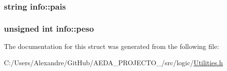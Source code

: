 \subsubsection[{pais}]{\setlength{\rightskip}{0pt plus 5cm}string info\+::pais}\label{structinfo_a37b5c5d6ed7ce6cec6ab195ae298be96}
\hypertarget{structinfo_aaf2f4c91fa728eba96d18912d3eca865}{}
\subsubsection[{peso}]{\setlength{\rightskip}{0pt plus 5cm}unsigned int info\+::peso}\label{structinfo_aaf2f4c91fa728eba96d18912d3eca865}


The documentation for this struct was generated from the following file\+:\begin{DoxyCompactItemize}
\item 
C\+:/\+Users/\+Alexandre/\+Git\+Hub/\+A\+E\+D\+A\+\_\+\+P\+R\+O\+J\+E\+C\+T\+O\+\_/src/logic/\hyperlink{_utilities_8h}{Utilities.\+h}\end{DoxyCompactItemize}
